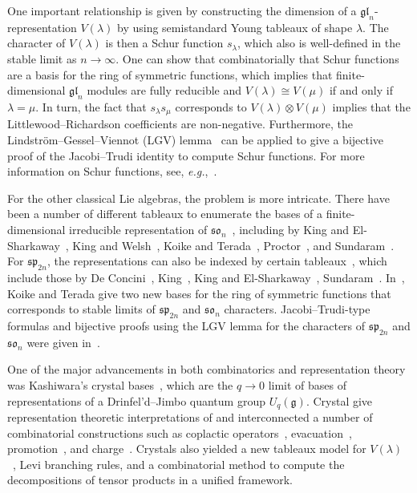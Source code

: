 \documentclass[11pt, leqno]{amsart}
\theoremstyle{plain}
\theoremstyle{definition}
\numberwithin{equation}{section}
\newcommand{\g}{\mathfrak{g}}
\newcommand{\iso}{\cong} %
\begin{document}
One important relationship is given by constructing the dimension of a $\mathfrak{gl}_n$-representation $V(\lambda)$ by using semistandard Young tableaux of shape $\lambda$. The character of $V(\lambda)$ is then a Schur function $s_{\lambda}$, which also is well-defined in the stable limit as $n \to \infty$. One can show that combinatorially that Schur functions are a basis for the ring of symmetric functions, which implies that finite-dimensional $\mathfrak{gl}_n$ modules are fully reducible and $V(\lambda) \iso V(\mu)$ if and only if $\lambda = \mu$. In turn, the fact that $s_{\lambda} s_{\mu}$ corresponds to $V(\lambda) \otimes V(\mu)$ implies that the Littlewood--Richardson coefficients are non-negative. Furthermore, the Lindstr\"om--Gessel--Viennot (LGV) lemma~\cite{Lindstrom73,GV85} can be applied to give a bijective proof of the Jacobi--Trudi identity to compute Schur functions. For more information on Schur functions, see, \textit{e.g.},~\cite[Ch.~7]{ECII}.

For the other classical Lie algebras, the problem is more intricate. There have been a number of different tableaux to enumerate the bases of a finite-dimensional irreducible representation of $\mathfrak{so}_n$~\cite{KW93}, including by King and El-Sharkaway~\cite{KElS83}, King and Welsh~\cite{KW93}, Koike and Terada~\cite{KT90}, Proctor~\cite{Proctor90III,Proctor94}, and Sundaram~\cite{Sundaram90}. For $\mathfrak{sp}_{2n}$, the representations can also be indexed by certain tableaux~\cite{Berele86}, which include those by De Concini~\cite{dC79}, King~\cite{King76}, King and El-Sharkaway~\cite{KElS83}, Sundaram~\cite{Sundaram86}.
In~\cite{KT87}, Koike and Terada give two new bases for the ring of symmetric functions that corresponds to stable limits of $\mathfrak{sp}_{2n}$ and $\mathfrak{so}_n$ characters.
Jacobi--Trudi-type formulas and bijective proofs using the LGV lemma for the characters of $\mathfrak{sp}_{2n}$ and $\mathfrak{so}_n$ were given in~\cite{FK97,SV16}.

One of the major advancements in both combinatorics and representation theory was Kashiwara's crystal bases~\cite{K90,K91}, which are the $q \to 0$ limit of bases of representations of a Drinfel'd--Jimbo quantum group $U_q(\g)$. Crystal give representation theoretic interpretations of and interconnected a number of combinatorial constructions such as coplactic operators~\cite{Lothaire02}, evacuation~\cite{Lenart07}, promotion~\cite{Shimozono02}, and charge~\cite{NY97}. Crystals also yielded a new tableaux model for $V(\lambda)$~\cite{KN94}, Levi branching rules, and a combinatorial method to compute the decompositions of tensor products in a unified framework.
\end{document}
